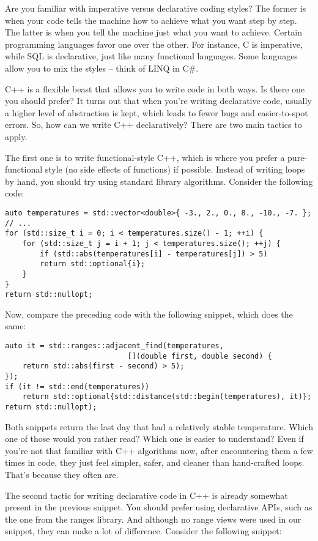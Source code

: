 
Are you familiar with imperative versus declarative coding styles? The former is when your code tells the machine how to achieve what you want step by step. The latter is when you tell the machine just what you want to achieve. Certain programming languages favor one over the other. For instance, C is imperative, while SQL is declarative, just like many functional languages. Some languages allow you to mix the styles – think of LINQ in C\#.

C++ is a flexible beast that allows you to write code in both ways. Is there one you should prefer? It turns out that when you're writing declarative code, usually a higher level of abstraction is kept, which leads to fewer bugs and easier-to-spot errors. So, how can we write C++ declaratively? There are two main tactics to apply.

The first one is to write functional-style C++, which is where you prefer a pure-functional style (no side effects of functions) if possible. Instead of writing loops by hand, you should try using standard library algorithms. Consider the following code:

\begin{lstlisting}[style=styleCXX]
auto temperatures = std::vector<double>{ -3., 2., 0., 8., -10., -7. };
// ...
for (std::size_t i = 0; i < temperatures.size() - 1; ++i) {
	for (std::size_t j = i + 1; j < temperatures.size(); ++j) {
		if (std::abs(temperatures[i] - temperatures[j]) > 5)
		return std::optional{i};
	}
}
return std::nullopt;
\end{lstlisting}

Now, compare the preceding code with the following snippet, which does the same:

\begin{lstlisting}[style=styleCXX]
auto it = std::ranges::adjacent_find(temperatures,
							[](double first, double second) {
	return std::abs(first - second) > 5);
});
if (it != std::end(temperatures))
	return std::optional{std::distance(std::begin(temperatures), it)};
return std::nullopt);
\end{lstlisting}

Both snippets return the last day that had a relatively stable temperature. Which one of those would you rather read? Which one is easier to understand? Even if you're not that familiar with C++ algorithms now, after encountering them a few times in code, they just feel simpler, safer, and cleaner than hand-crafted loops. That's because they often are.

The second tactic for writing declarative code in C++ is already somewhat present in the previous snippet. You should prefer using declarative APIs, such as the one from the ranges library. And although no range views were used in our snippet, they can make a lot of difference. Consider the following snippet:

